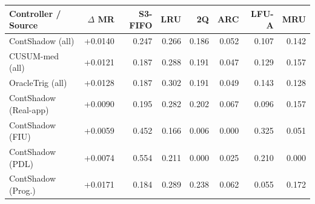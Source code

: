 \begin{tabular}{lrrrrrrr}
\toprule
Controller / Source & $\Delta$ MR & S3-FIFO & LRU & 2Q & ARC & LFU-A & MRU \\
\midrule
ContShadow (all) & +0.0140 & 0.247 & 0.266 & 0.186 & 0.052 & 0.107 & 0.142 \\
CUSUM-med (all) & +0.0121 & 0.187 & 0.288 & 0.191 & 0.047 & 0.129 & 0.157 \\
OracleTrig (all) & +0.0128 & 0.187 & 0.302 & 0.191 & 0.049 & 0.143 & 0.128 \\
\midrule
ContShadow (Real-app) & +0.0090 & 0.195 & 0.282 & 0.202 & 0.067 & 0.096 & 0.157 \\
ContShadow (FIU) & +0.0059 & 0.452 & 0.166 & 0.006 & 0.000 & 0.325 & 0.051 \\
ContShadow (PDL) & +0.0074 & 0.554 & 0.211 & 0.000 & 0.025 & 0.210 & 0.000 \\
ContShadow (Prog.) & +0.0171 & 0.184 & 0.289 & 0.238 & 0.062 & 0.055 & 0.172 \\
\bottomrule
\end{tabular}
